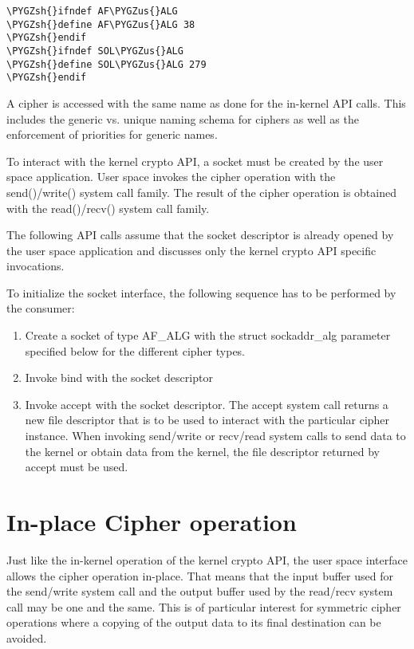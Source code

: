 \documentclass[a4paper,8pt,english]{sphinxmanual}
\def\PYGZus{\char`\_}
\def\PYGZsh{\char`\#}
\begin{document}
\begin{Verbatim}[commandchars=\\\{\}]
\PYGZsh{}ifndef AF\PYGZus{}ALG
\PYGZsh{}define AF\PYGZus{}ALG 38
\PYGZsh{}endif
\PYGZsh{}ifndef SOL\PYGZus{}ALG
\PYGZsh{}define SOL\PYGZus{}ALG 279
\PYGZsh{}endif
\end{Verbatim}

A cipher is accessed with the same name as done for the in-kernel API
calls. This includes the generic vs. unique naming schema for ciphers as
well as the enforcement of priorities for generic names.

To interact with the kernel crypto API, a socket must be created by the
user space application. User space invokes the cipher operation with the
send()/write() system call family. The result of the cipher operation is
obtained with the read()/recv() system call family.

The following API calls assume that the socket descriptor is already
opened by the user space application and discusses only the kernel
crypto API specific invocations.

To initialize the socket interface, the following sequence has to be
performed by the consumer:
\begin{enumerate}
\item {} 
Create a socket of type AF\_ALG with the struct sockaddr\_alg
parameter specified below for the different cipher types.

\item {} 
Invoke bind with the socket descriptor

\item {} 
Invoke accept with the socket descriptor. The accept system call
returns a new file descriptor that is to be used to interact with the
particular cipher instance. When invoking send/write or recv/read
system calls to send data to the kernel or obtain data from the
kernel, the file descriptor returned by accept must be used.

\end{enumerate}


\section{In-place Cipher operation}
\label{crypto/userspace-if:in-place-cipher-operation}
Just like the in-kernel operation of the kernel crypto API, the user
space interface allows the cipher operation in-place. That means that
the input buffer used for the send/write system call and the output
buffer used by the read/recv system call may be one and the same. This
is of particular interest for symmetric cipher operations where a
copying of the output data to its final destination can be avoided.
\end{document}

